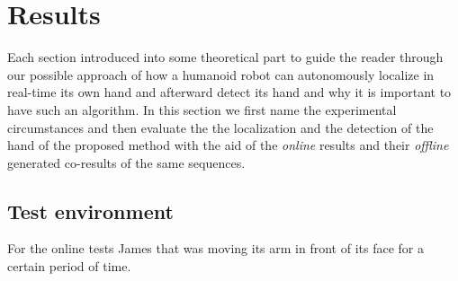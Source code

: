 \documentclass[conference]{IEEEtran}
\begin{document}
%
%
\section{Results}\label{results}
Each section introduced into some theoretical part to guide the reader through our possible approach of how a humanoid robot can autonomously localize in real-time its own hand and afterward detect its hand and why it is important to have such an algorithm. In this section we first name the experimental circumstances and then evaluate the the localization and the detection of the hand of the proposed method with the aid of the \textit{online} results and their \textit{offline} generated co-results of the same sequences.
%

%
%
\subsection{Test environment}\label{results:testenv}
For the online tests James that was moving its arm in front of its face for a certain period of time. 
%
%
%
\end{document}
